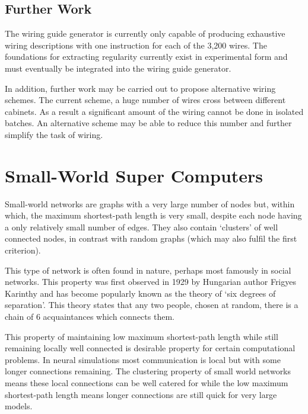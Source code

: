 		\subsection{Further Work}
			
			
			The wiring guide generator is currently only capable of producing
			exhaustive wiring descriptions with one instruction for each of the 3,200
			wires. The foundations for extracting regularity currently exist in
			experimental form and must eventually be integrated into the wiring guide
			generator.
			
			In addition, further work may be carried out to propose alternative wiring
			schemes. The current scheme, a huge number of wires cross between
			different cabinets. As a result a significant amount of the wiring cannot
			be done in isolated batches. An alternative scheme may be able to reduce
			this number and further simplify the task of wiring.
	
	\section{Small-World Super Computers}
		
		
		Small-world networks are graphs with a very large number of nodes but,
		within which, the maximum shortest-path length is very small, despite each
		node having a only relatively small number of edges. They also contain
		`clusters' of well connected nodes, in contrast with random graphs (which
		may also fulfil the first criterion).
		
		This type of network is often found in nature, perhaps most famously in
		social networks. This property was first observed in 1929 by Hungarian
		author Frigyes Karinthy\cite{karinthy29} and has become popularly known as
		the theory of `six degrees of separation'. This theory states that any two
		people, chosen at random, there is a chain of 6 acquaintances which connects
		them.
		
		This property of maintaining low maximum shortest-path length while still
		remaining locally well connected is desirable property for certain
		computational problems. In neural simulations most communication is local
		but with some longer connections remaining. The clustering property of small
		world networks means these local connections can be well catered for while
		the low maximum shortest-path length means longer connections are still
		quick for very large models.
		
